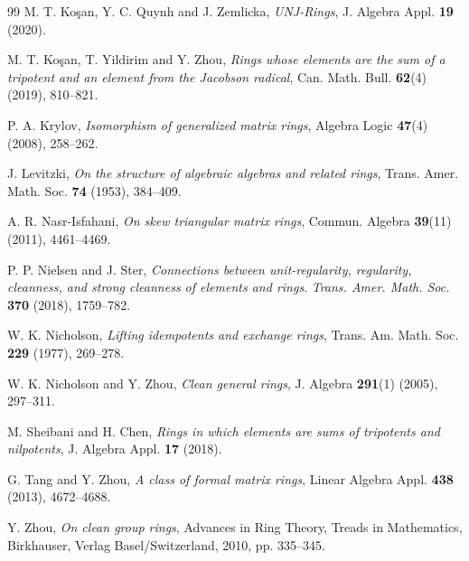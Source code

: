 \documentclass[12pt]{amsart}
\theoremstyle{definition}
\begin{document}
\begin{thebibliography}{99}
M. T. Ko\c{s}an, Y. C. Quynh and J. Zemlicka, {\it UNJ-Rings}, J. Algebra Appl. {\bf 19} (2020).

M. T. Ko\c{s}an, T. Yildirim and Y. Zhou, {\it Rings whose elements are the sum of a tripotent and an element from the Jacobson radical}, Can. Math. Bull. {\bf 62}(4) (2019), 810--821.

P. A. Krylov, {\it Isomorphism of generalized matrix rings}, Algebra Logic {\bf 47}(4) (2008), 258--262.

J. Levitzki, {\it On the structure of algebraic algebras and related rings}, Trans. Amer. Math. Soc. {\bf 74} (1953), 384--409.

A. R. Nasr-Isfahani, {\it On skew triangular matrix rings}, Commun. Algebra {\bf 39}(11) (2011), 4461--4469.

P. P. Nielsen and J. Ster, {\it Connections between unit-regularity, regularity, cleanness, and strong cleanness of elements and rings}. {\it Trans. Amer. Math. Soc.} {\bf 370} (2018), 1759--782.

W. K. Nicholson, {\it Lifting idempotents and exchange rings}, Trans. Am. Math. Soc. {\bf 229} (1977), 269--278.

W. K. Nicholson and Y. Zhou, {\it Clean general rings}, J. Algebra {\bf 291}(1) (2005), 297--311.

M. Sheibani and H. Chen, {\it Rings in which elements are sums of tripotents and nilpotents}, J. Algebra Appl. {\bf 17} (2018).

G. Tang and Y. Zhou, {\it A class of formal matrix rings}, Linear Algebra Appl. {\bf 438} (2013), 4672--4688.

Y. Zhou, {\it On clean group rings}, Advances in Ring Theory, Treads in Mathematics, Birkhauser, Verlag Basel/Switzerland, 2010, pp. 335--345.

\end{thebibliography}
\end{document}

